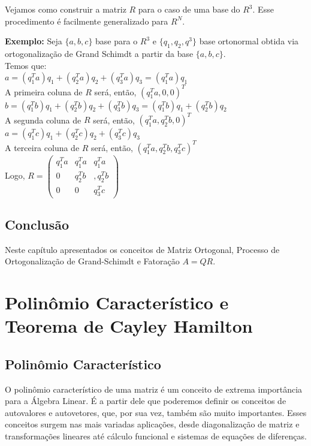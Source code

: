 \documentclass[12pt]{article}
\begin{document}
	Vejamos como construir a matriz $R$ para o caso de uma base do $R^3$. Esse procedimento é facilmente generalizado para $R^N$.
	
	\textbf{Exemplo:} Seja $\{a,b,c\}$ base para o $R^3$ e $\{q_1,q_2,q^3\}$ base ortonormal obtida via ortogonalização de Grand Schimdt a partir da base $\{a,b,c\}$.\\
	
	Temos que:\\
	
	$a=(q_1^Ta)q_1+(q_2^Ta)q_2+(q_3^Ta)q_3=(q_1^Ta)q_1$\\
	
	A primeira coluna de $R$ será, então, $(q_1^{T}a,0,0)^T$\\
	
	$b=(q_1^Tb)q_1+(q_2^Tb)q_2+(q_3^Tb)q_3=(q_1^Tb)q_1+(q_2^Tb)q_2$\\
	
	A segunda coluna de $R$ será, então, $(q_1^{T}a,q_2^Tb,0)^T$\\
	
	$a=(q_1^Tc)q_1+(q_2^Tc)q_2+(q_3^Tc)q_3$\\
	
	A terceira coluna de $R$ será, então, $(q_1^{T}a,q_2^Tb,q_3^Tc)^T$\\
	
	Logo, $R=\begin{pmatrix}
		q_1^{T}a & q_1^{T}a & q_1^{T}a\\
		0 &  q_2^Tb& ,q_2^Tb\\ 
		0 & 0 & q_3^Tc
	\end{pmatrix}$
	
	\subsection{Conclusão}
	Neste capítulo apresentados os conceitos de Matriz Ortogonal, Processo de Ortogonalização de Grand-Schimdt e Fatoração $A=QR$.
	
	
	\section{Polinômio Característico e Teorema de Cayley Hamilton}
	
	\subsection{Polinômio Característico}
	
	O polinômio característico de uma matriz é um conceito de extrema importância para a Álgebra Linear. É a partir dele que poderemos definir os conceitos de autovalores e autovetores, que, por sua vez, também são muito importantes. Esses conceitos surgem nas mais variadas aplicações, desde diagonalização de matriz e transformações lineares até cálculo funcional e sistemas de equações de diferenças.
	
\end{document}
